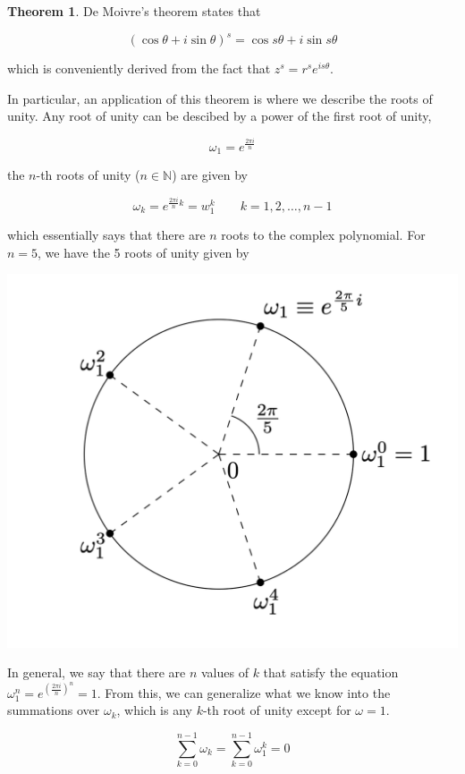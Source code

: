 \documentclass[12pt]{article}
\theoremstyle{definition}
\newtheorem{theorem}{Theorem}[section]
\begin{document}
\begin{theorem}
    De Moivre's theorem states that

    $$(\cos \theta + i \sin \theta)^s = \cos{s \theta} + i \sin{s \theta}$$

    which is conveniently derived from the fact that $z^s = r^s e^{is\theta}$.
\end{theorem}

In particular, an application of this theorem is where we describe the roots of unity. Any root of unity can be descibed by a power of the first root of unity, 

$$\omega_1 = e^\frac{2 \pi i}{n}$$

the $n$-th roots of unity ($n \in \mathbb{N}$) are given by

$$
\omega_k = e^{\frac{2\pi i}{n} k} = w_1^k \qquad k = 1, 2, \ldots, n-1
$$

which essentially says that there are $n$ roots to the complex polynomial. For $n=5$, we have the 5 roots of unity given by

\includegraphics[width=\textwidth]{3_roots_unity}

In general, we say that there are $n$ values of $k$ that satisfy the equation $\displaystyle \omega_1^n = e^{(\frac{2 \pi i}{n})^n} = 1$. From this, we can generalize what we know into the summations over $\omega_k$, which is any $k$-th root of unity except for $\omega = 1$. 

$$\sum_{k=0}^{n-1} \omega_k = \sum_{k=0}^{n-1} \omega^k_1 = 0$$
\end{document}
